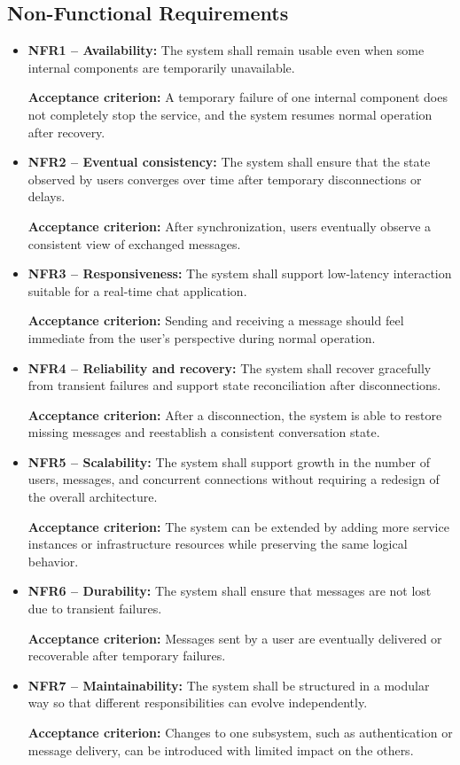 \documentclass{scrartcl}
\begin{document}
\subsection{Non-Functional Requirements}

\begin{itemize}
	\item \textbf{NFR1 -- Availability:} The system shall remain usable even when some internal components are temporarily unavailable.
	
	\textbf{Acceptance criterion:} A temporary failure of one internal component does not completely stop the service, and the system resumes normal operation after recovery.
	
	\item \textbf{NFR2 -- Eventual consistency:} The system shall ensure that the state observed by users converges over time after temporary disconnections or delays.
	
	\textbf{Acceptance criterion:} After synchronization, users eventually observe a consistent view of exchanged messages.
	
	\item \textbf{NFR3 -- Responsiveness:} The system shall support low-latency interaction suitable for a real-time chat application.
	
	\textbf{Acceptance criterion:} Sending and receiving a message should feel immediate from the user's perspective during normal operation.
	
	\item \textbf{NFR4 -- Reliability and recovery:} The system shall recover gracefully from transient failures and support state reconciliation after disconnections.
	
	\textbf{Acceptance criterion:} After a disconnection, the system is able to restore missing messages and reestablish a consistent conversation state.
	
	\item \textbf{NFR5 -- Scalability:} The system shall support growth in the number of users, messages, and concurrent connections without requiring a redesign of the overall architecture.
	
	\textbf{Acceptance criterion:} The system can be extended by adding more service instances or infrastructure resources while preserving the same logical behavior.
	
	\item \textbf{NFR6 -- Durability:} The system shall ensure that messages are not lost due to transient failures.
	
	\textbf{Acceptance criterion:} Messages sent by a user are eventually delivered or recoverable after temporary failures.
	
	\item \textbf{NFR7 -- Maintainability:} The system shall be structured in a modular way so that different responsibilities can evolve independently.
	
	\textbf{Acceptance criterion:} Changes to one subsystem, such as authentication or message delivery, can be introduced with limited impact on the others.
\end{itemize}
\end{document}
